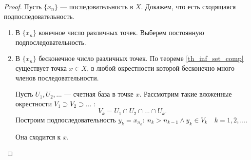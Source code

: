 \documentclass[11pt]{book}
\theoremstyle{definition}
\theoremstyle{plain}
\theoremstyle{plain}
\theoremstyle{definition}
\theoremstyle{remark}
\begin{document}
\begin{proof}
    Пусть $ \{x_{n}\}$ --- последовательность в $ X$. Докажем, что есть сходящаяся подпоследовательность.
    \begin{enumerate}
	\item В $ \{x_n\}$ конечное число различных точек. Выберем постоянную подпоследовательность.
	\item В $ \{x_{n}\}$ бесконечное число различных точек. По теореме \ref{th_inf_set_comp} существует точка $ x \in X$, в любой окрестности которой бесконечно много членов последовательности.

	    Пусть $ U_1, U_2, \ldots $ --- счетная база в точке $ x$. Рассмотрим такие вложенные окрестности
	    $ V_1 \supset V_2 \supset \ldots $ :
	    \[
		V_k = U_1 \cap U_2 \cap  \ldots \cap U_k
	    .\]
	    Построим подпоследовательность $ y_k = x_{n_k}: ~ n_k > n_{k-1} \wedge y_k \in V_k \quad k = 1, 2, \ldots $.

	    Она сходится к $ x$.
    \end{enumerate}
\end{proof}
\end{document}
